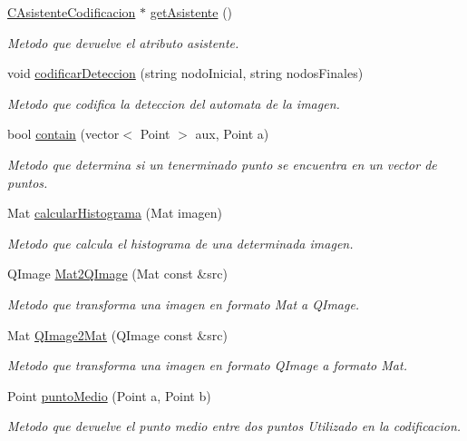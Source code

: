 \begin{DoxyCompactItemize}
\hyperlink{classCAsistenteCodificacion}{C\+Asistente\+Codificacion} $\ast$ \hyperlink{classCOperacionesImagen_a28f7cbaaff0e626d6f94be6edbe900b8}{get\+Asistente} ()
\begin{DoxyCompactList}\small\item\em Metodo que devuelve el atributo asistente. \end{DoxyCompactList}\item 
void \hyperlink{classCOperacionesImagen_aaac35f5fc47a2a7c8abb8d00fc89879a}{codificar\+Deteccion} (string nodo\+Inicial, string nodos\+Finales)
\begin{DoxyCompactList}\small\item\em Metodo que codifica la deteccion del automata de la imagen. \end{DoxyCompactList}\item 
bool \hyperlink{classCOperacionesImagen_ae0b1cc753d1c4f62a2c9dce6f213ba95}{contain} (vector$<$ Point $>$ aux, Point a)
\begin{DoxyCompactList}\small\item\em Metodo que determina si un tenerminado punto se encuentra en un vector de puntos. \end{DoxyCompactList}\item 
Mat \hyperlink{classCOperacionesImagen_aa40399f6525ea0e3b76a246e5cccdc06}{calcular\+Histograma} (Mat imagen)
\begin{DoxyCompactList}\small\item\em Metodo que calcula el histograma de una determinada imagen. \end{DoxyCompactList}\item 
Q\+Image \hyperlink{classCOperacionesImagen_a81462b6d034a47905ff9ea337349042e}{Mat2\+Q\+Image} (Mat const \&src)
\begin{DoxyCompactList}\small\item\em Metodo que transforma una imagen en formato Mat a Q\+Image. \end{DoxyCompactList}\item 
Mat \hyperlink{classCOperacionesImagen_a9aa86962598a4354e95168ee6645e4e7}{Q\+Image2\+Mat} (Q\+Image const \&src)
\begin{DoxyCompactList}\small\item\em Metodo que transforma una imagen en formato Q\+Image a formato Mat. \end{DoxyCompactList}\item 
Point \hyperlink{classCOperacionesImagen_a677a389169905ef82c72251a61b9e6c4}{punto\+Medio} (Point a, Point b)
\begin{DoxyCompactList}\small\item\em Metodo que devuelve el punto medio entre dos puntos Utilizado en la codificacion. \end{DoxyCompactList}\end{DoxyCompactItemize}
